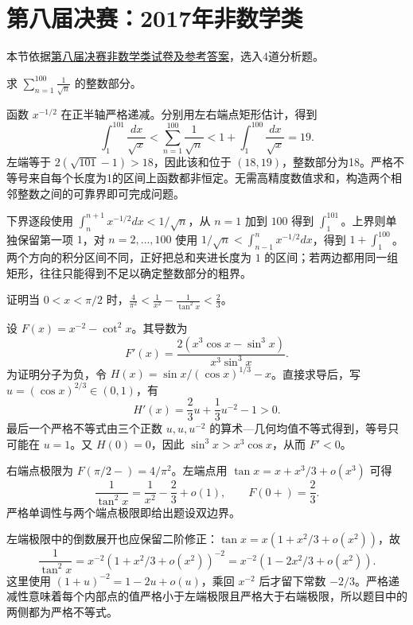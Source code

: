 \documentclass[12pt,fontset=fandol]{ctexart}
\begin{document}
\section{第八届决赛：2017年非数学类}
本节依据\href{https://math.ecnu.edu.cn/llin/pdf_files/nonmathfinalans2017.pdf}{第八届决赛非数学类试卷及参考答案}，选入4道分析题。

\begin{example}\label{nm-final8-1d}
求 $\displaystyle\sum_{n=1}^{100}\frac1{\sqrt n}$ 的整数部分。
\end{example}
\begin{solve}
函数 $x^{-1/2}$ 在正半轴严格递减。分别用左右端点矩形估计，得到
\[
 \int_1^{101}\frac{dx}{\sqrt x}
 <\sum_{n=1}^{100}\frac1{\sqrt n}
 <1+\int_1^{100}\frac{dx}{\sqrt x}=19.
\]
左端等于 $2(\sqrt{101}-1)>18$，因此该和位于 $(18,19)$，整数部分为18。严格不等号来自每个长度为1的区间上函数都非恒定。无需高精度数值求和，构造两个相邻整数之间的可靠界即可完成问题。

下界逐段使用 $\int_n^{n+1}x^{-1/2}dx<1/\sqrt n$，从 $n=1$ 加到 $100$ 得到 $\int_1^{101}$。上界则单独保留第一项 $1$，对 $n=2,\ldots,100$ 使用 $1/\sqrt n<\int_{n-1}^nx^{-1/2}dx$，得到 $1+\int_1^{100}$。两个方向的积分区间不同，正好把总和夹进长度为 $1$ 的区间；若两边都用同一组矩形，往往只能得到不足以确定整数部分的粗界。

\end{solve}

\begin{example}\label{nm-final8-2}
证明当 $0<x<\pi/2$ 时，$\displaystyle\frac4{\pi^2}<\frac1{x^2}-\frac1{\tan^2x}<\frac23$。
\end{example}
\begin{solve}
设 $F(x)=x^{-2}-\cot^2x$。其导数为
\[
 F'(x)=\frac{2(x^3\cos x-\sin^3x)}{x^3\sin^3x}.
\]
为证明分子为负，令 $H(x)=\sin x/(\cos x)^{1/3}-x$。直接求导后，写 $u=(\cos x)^{2/3}\in(0,1)$，有
\[
 H'(x)=\frac23u+\frac13u^{-2}-1>0.
\]
最后一个严格不等式由三个正数 $u,u,u^{-2}$ 的算术—几何均值不等式得到，等号只可能在 $u=1$。又 $H(0)=0$，因此 $\sin^3x>x^3\cos x$，从而 $F'<0$。

右端点极限为 $F(\pi/2-)=4/\pi^2$。左端点用 $\tan x=x+x^3/3+o(x^3)$ 可得
\[
 \frac1{\tan^2x}=\frac1{x^2}-\frac23+o(1),
 \qquad F(0+)=\frac23.
\]
严格单调性与两个端点极限即给出题设双边界。

左端极限中的倒数展开也应保留二阶修正：$\tan x=x(1+x^2/3+o(x^2))$，故
\[
\frac1{\tan^2x}=x^{-2}(1+x^2/3+o(x^2))^{-2}
=x^{-2}(1-2x^2/3+o(x^2)).
\]
这里使用 $(1+u)^{-2}=1-2u+o(u)$，乘回 $x^{-2}$ 后才留下常数 $-2/3$。严格递减性意味着每个内部点的值严格小于左端极限且严格大于右端极限，所以题目中的两侧都为严格不等式。

\end{solve}
\end{document}
